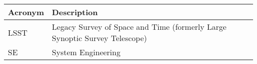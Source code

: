 \addtocounter{table}{-1}
\begin{longtable}{p{}p{}}\hline
\textbf{Acronym} & \textbf{Description}  \\\hline

LSST & Legacy Survey of Space and Time (formerly Large Synoptic Survey Telescope) \\\hline
SE & System Engineering \\\hline
\end{longtable}
